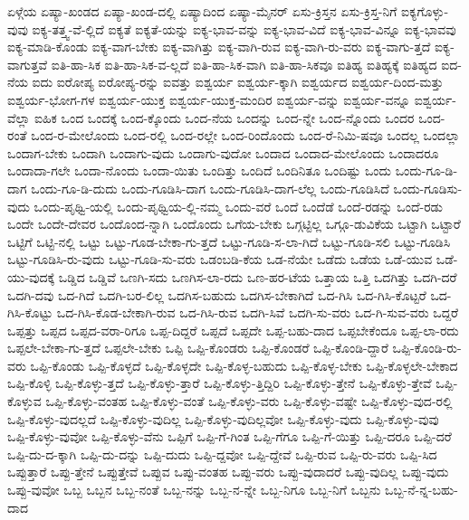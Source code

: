 {ಏಳ್ಗೆಯ
ಏಷ್ಯಾ-ಖಂಡದ
ಏಷ್ಯಾ-ಖಂಡ-ದಲ್ಲಿ
ಏಷ್ಯಾದಿಂದ
ಏಷ್ಯಾ-ಮೈನರ್
ಏಸು-ಕ್ರಿಸ್ತನ
ಏಸು-ಕ್ರಿಸ್ತ-ನಿಗೆ
ಐಕ್ಯಗೊಳ್ಳು-ವುವು
ಐಕ್ಯ-ತತ್ತ್ವ-ವೆ-ಲ್ಲಿದೆ
ಐಕ್ಯತೆ
ಐಕ್ಯತೆ-ಯನ್ನು
ಐಕ್ಯ-ಭಾವ-ವನ್ನು
ಐಕ್ಯ-ಭಾವ-ವಿದೆ
ಐಕ್ಯ-ಭಾವ-ವಿನ್ನೂ
ಐಕ್ಯ-ಭಾವವು
ಐಕ್ಯ-ಮಾಡಿ-ಕೊಂಡು
ಐಕ್ಯ-ವಾಗ-ಬೇಕು
ಐಕ್ಯ-ವಾಗಿತ್ತು
ಐಕ್ಯ-ವಾಗಿ-ರುವ
ಐಕ್ಯ-ವಾಗಿ-ರು-ವರು
ಐಕ್ಯ-ವಾಗು-ತ್ತದೆ
ಐಕ್ಯ-ವಾಗುತ್ತವೆ
ಐತಿ-ಹಾ-ಸಿಕ
ಐತಿ-ಹಾ-ಸಿಕ-ವ-ಲ್ಲದೆ
ಐತಿ-ಹಾ-ಸಿಕ-ವಾಗಿ
ಐತಿ-ಹಾ-ಸಿಕವೂ
ಐತಿಹ್ಯ
ಐತಿಹ್ಯಕ್ಕೆ
ಐತಿಹ್ಯದ
ಐದ-ನೆಯ
ಐದು
ಐರೋಪ್ಯ
ಐರೋಪ್ಯ-ರನ್ನು
ಐವತ್ತು
ಐಶ್ವರ್ಯ
ಐಶ್ವರ್ಯ-ಕ್ಕಾಗಿ
ಐಶ್ವರ್ಯದ
ಐಶ್ವರ್ಯ-ದಿಂದ-ಮತ್ತು
ಐಶ್ವರ್ಯ-ಭೋಗ-ಗಳ
ಐಶ್ವರ್ಯ-ಯುಕ್ತ
ಐಶ್ವರ್ಯ-ಯುಕ್ತ-ಮಂದಿರ
ಐಶ್ವರ್ಯ-ವನ್ನು
ಐಶ್ವರ್ಯ-ವನ್ನೂ
ಐಶ್ವರ್ಯ-ವೆಲ್ಲಾ
ಐಹಿಕ
ಒಂದ
ಒಂದಕ್ಕೆ
ಒಂದ-ಕ್ಕೊಂದು
ಒಂದ-ನೆಯ
ಒಂದನ್ನು
ಒಂದ-ನ್ನೇ
ಒಂದ-ನ್ನೊಂದು
ಒಂದರ
ಒಂದ-ರಂತೆ
ಒಂದ-ರ-ಮೇಲೊಂದು
ಒಂದ-ರಲ್ಲಿ
ಒಂದ-ರಲ್ಲೇ
ಒಂದ-ರಿಂದೊಂದು
ಒಂದ-ರೆ-ನಿಮಿ-ಷವೂ
ಒಂದಲ್ಲ
ಒಂದಲ್ಲಾ
ಒಂದಾಗ-ಬೇಕು
ಒಂದಾಗಿ
ಒಂದಾಗು-ವುದು
ಒಂದಾಗು-ವುದೋ
ಒಂದಾದ
ಒಂದಾದ-ಮೇಲೊಂದು
ಒಂದಾದರೂ
ಒಂದಾದಾ-ಗಲೇ
ಒಂದಾ-ನೊಂದು
ಒಂದಾ-ಯಿತು
ಒಂದಿತ್ತು
ಒಂದಿದೆ
ಒಂದಿನಿತೂ
ಒಂದಿಷ್ಟು
ಒಂದು
ಒಂದು-ಗೂ-ಡಿ-ದಾಗ
ಒಂದು-ಗೂ-ಡಿ-ದುದು
ಒಂದು-ಗೂಡಿಸಿ-ದಾಗ
ಒಂದು-ಗೂಡಿಸಿ-ದಾಗ-ಲೆಲ್ಲ
ಒಂದು-ಗೂಡಿಸಿದೆ
ಒಂದು-ಗೂಡಿಸು-ವುದು
ಒಂದು-ಪೃಥ್ವಿ-ಯಲ್ಲಿ
ಒಂದು-ಪೃಥ್ವಿಯ-ಲ್ಲಿ-ನಮ್ಮ
ಒಂದು-ವರೆ
ಒಂದೆ
ಒಂದೆಡೆ
ಒಂದೆ-ರಡನ್ನು
ಒಂದೆ-ರಡು
ಒಂದೇ
ಒಂದೇ-ದೇವರ
ಒಂದೊಂದ-ನ್ನಾಗಿ
ಒಂದೊಂದು
ಒಗೆಯ-ಬೇಕು
ಒಗ್ಗಟ್ಟಿಲ್ಲ
ಒಗ್ಗೂ-ಡುವಿಕೆಯ
ಒಟ್ಟಾಗಿ
ಒಟ್ಟಾರೆ
ಒಟ್ಟಿಗೆ
ಒಟ್ಟಿ-ನಲ್ಲಿ
ಒಟ್ಟು
ಒಟ್ಟು-ಗೂಡ-ಬೇಕಾ-ಗು-ತ್ತದೆ
ಒಟ್ಟು-ಗೂಡಿ-ಸ-ಲಾ-ಗಿದೆ
ಒಟ್ಟು-ಗೂಡಿ-ಸಲಿ
ಒಟ್ಟು-ಗೂಡಿಸಿ
ಒಟ್ಟು-ಗೂಡಿಸಿ-ರು-ವುದು
ಒಟ್ಟು-ಗೂಡಿ-ಸು-ವರು
ಒಡಂಬಡಿ-ಕೆಯ
ಒಡ-ನೆಯೇ
ಒಡೆದು
ಒಡೆಯ
ಒಡೆ-ಯುವ
ಒಡೆ-ಯು-ವುದಕ್ಕೆ
ಒಡ್ಡಿದ
ಒಡ್ಡಿವೆ
ಒಣಗಿ-ಸದು
ಒಣಗಿಸ-ಲಾ-ರದು
ಒಣ-ಹರ-ಟೆಯ
ಒತ್ತಾಯ
ಒತ್ತಿ
ಒದಗಿತ್ತು
ಒದಗಿ-ದರೆ
ಒದಗಿ-ದವು
ಒದ-ಗಿದೆ
ಒದಗಿ-ಬರ-ಲಿಲ್ಲ
ಒದಗಿಸ-ಬಹುದು
ಒದಗಿಸ-ಬೇಕಾಗಿದೆ
ಒದ-ಗಿಸಿ
ಒದ-ಗಿಸಿ-ಕೊಟ್ಟರೆ
ಒದ-ಗಿಸಿ-ಕೊಟ್ಟು
ಒದ-ಗಿಸಿ-ಕೊಡ-ಬೇಕಾಗಿ-ರುವ
ಒದ-ಗಿಸಿ-ರುವ
ಒದಗಿ-ಸಿವೆ
ಒದಗಿ-ಸು-ವರು
ಒದ-ಗಿ-ಸುವ-ವರು
ಒದ್ದರೆ
ಒಪ್ಪತ್ತು
ಒಪ್ಪದ
ಒಪ್ಪದ-ವರಾ-ರಿಗೂ
ಒಪ್ಪ-ದಿದ್ದರೆ
ಒಪ್ಪದೆ
ಒಪ್ಪದೇ
ಒಪ್ಪ-ಬಹು-ದಾದ
ಒಪ್ಪಬೇಕೆಂದೂ
ಒಪ್ಪ-ಲಾ-ರದು
ಒಪ್ಪಲೇ-ಬೇಕಾ-ಗು-ತ್ತದೆ
ಒಪ್ಪಲೇ-ಬೇಕು
ಒಪ್ಪಿ
ಒಪ್ಪಿ-ಕೊಂಡರು
ಒಪ್ಪಿ-ಕೊಂಡರೆ
ಒಪ್ಪಿ-ಕೊಂಡಿ-ದ್ದಾರೆ
ಒಪ್ಪಿ-ಕೊಂಡಿ-ರು-ವರು
ಒಪ್ಪಿ-ಕೊಂಡು
ಒಪ್ಪಿ-ಕೊಳ್ಳದೆ
ಒಪ್ಪಿ-ಕೊಳ್ಳದೇ
ಒಪ್ಪಿ-ಕೊಳ್ಳ-ಬಹುದು
ಒಪ್ಪಿ-ಕೊಳ್ಳ-ಬೇಕು
ಒಪ್ಪಿ-ಕೊಳ್ಳಲೇ-ಬೇಕಾದ
ಒಪ್ಪಿ-ಕೊಳ್ಳಿ
ಒಪ್ಪಿ-ಕೊಳ್ಳು-ತ್ತದೆ
ಒಪ್ಪಿ-ಕೊಳ್ಳು-ತ್ತಾರೆ
ಒಪ್ಪಿ-ಕೊಳ್ಳು-ತ್ತಿದ್ದಿರಿ
ಒಪ್ಪಿ-ಕೊಳ್ಳು-ತ್ತೇನೆ
ಒಪ್ಪಿ-ಕೊಳ್ಳು-ತ್ತೇವೆ
ಒಪ್ಪಿ-ಕೊಳ್ಳುವ
ಒಪ್ಪಿ-ಕೊಳ್ಳು-ವಂತಹ
ಒಪ್ಪಿ-ಕೊಳ್ಳು-ವಂತೆ
ಒಪ್ಪಿ-ಕೊಳ್ಳು-ವರು
ಒಪ್ಪಿ-ಕೊಳ್ಳು-ವಷ್ಟೇ
ಒಪ್ಪಿ-ಕೊಳ್ಳು-ವುದ-ರಲ್ಲಿ
ಒಪ್ಪಿ-ಕೊಳ್ಳು-ವುದಲ್ಲದೆ
ಒಪ್ಪಿ-ಕೊಳ್ಳು-ವುದಿಲ್ಲ
ಒಪ್ಪಿ-ಕೊಳ್ಳು-ವುದಿಲ್ಲವೋ
ಒಪ್ಪಿ-ಕೊಳ್ಳು-ವುದು
ಒಪ್ಪಿ-ಕೊಳ್ಳು-ವುವು
ಒಪ್ಪಿ-ಕೊಳ್ಳು-ವುವೋ
ಒಪ್ಪಿ-ಕೊಳ್ಳು-ವೆನು
ಒಪ್ಪಿಗೆ
ಒಪ್ಪಿ-ಗೆ-ಗಿಂತ
ಒಪ್ಪಿ-ಗೆಗೂ
ಒಪ್ಪಿ-ಗೆ-ಯಿತ್ತು
ಒಪ್ಪಿ-ದರೂ
ಒಪ್ಪಿ-ದರೆ
ಒಪ್ಪಿ-ದು-ದ-ಕ್ಕಾಗಿ
ಒಪ್ಪಿ-ದು-ದನ್ನು
ಒಪ್ಪಿ-ದುದು
ಒಪ್ಪಿ-ದ್ದವೋ
ಒಪ್ಪಿ-ದ್ದೇವೆ
ಒಪ್ಪಿ-ರುವ
ಒಪ್ಪಿ-ರು-ವರು
ಒಪ್ಪಿ-ಸಿದ
ಒಪ್ಪುತ್ತಾರೆ
ಒಪ್ಪು-ತ್ತೇನೆ
ಒಪ್ಪುತ್ತೇವೆ
ಒಪ್ಪುವ
ಒಪ್ಪು-ವಂತಹ
ಒಪ್ಪು-ವರು
ಒಪ್ಪು-ವುದಾದರೆ
ಒಪ್ಪು-ವುದಿಲ್ಲ
ಒಪ್ಪು-ವುದು
ಒಪ್ಪು-ವುವೋ
ಒಬ್ಬ
ಒಬ್ಬನ
ಒಬ್ಬ-ನಂತೆ
ಒಬ್ಬ-ನನ್ನು
ಒಬ್ಬ-ನ-ನ್ನೇ
ಒಬ್ಬ-ನಿಗೂ
ಒಬ್ಬ-ನಿಗೆ
ಒಬ್ಬನು
ಒಬ್ಬ-ನೆ-ನ್ನ-ಬಹು-ದಾದ
}
